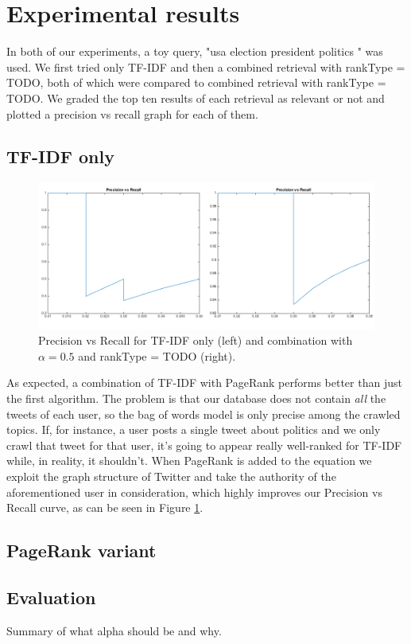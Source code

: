 \section{Experimental results}

In both of our experiments, a toy query, "usa election president politics " was used. We first tried 
only TF-IDF and then a combined retrieval with rankType = TODO, both of which were compared to combined 
retrieval with rankType = TODO. We graded the top ten results of each retrieval as relevant or not and 
plotted a precision vs recall graph for each of them.

\subsection{TF-IDF only}

\begin{figure}[H]
\centering
\includegraphics[width=5.5in,natwidth=534,natheight=345]{images/exptfidf.png}
\caption{Precision vs Recall for TF-IDF only (left) and combination with $\alpha = 0.5$ and rankType = TODO (right).}
\label{fig:exptfidf}
\end{figure}

As expected, a combination of TF-IDF with PageRank performs better than just the first algorithm.
The problem is that our database does not contain \emph{all} the tweets of each user, so the bag
of words model is only precise among the crawled topics. If, for instance, a user posts a single tweet
about politics and we only crawl that tweet for that user, it's going to appear really well-ranked for
TF-IDF while, in reality, it shouldn't. When PageRank is added to the equation we exploit the
graph structure of Twitter and take the authority of the aforementioned user in consideration, which
highly improves our Precision vs Recall curve, as can be seen in Figure \ref{fig:exptfidf}.

\subsection{PageRank variant}

\subsection{Evaluation}
Summary of what alpha should be and why.
